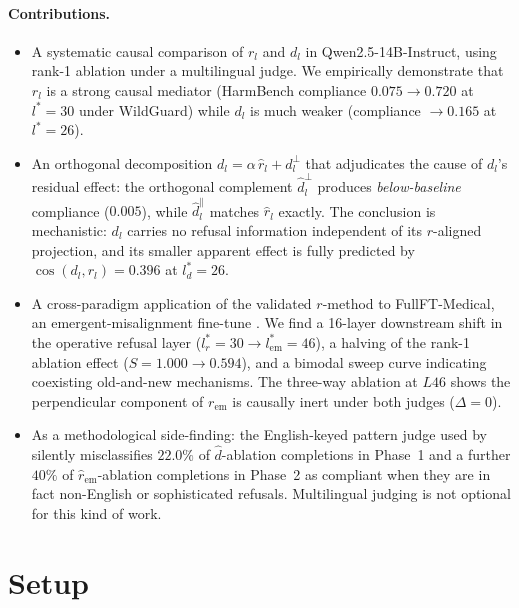 \paragraph{Contributions.}
\begin{itemize}\itemsep=0pt
\item A systematic causal comparison of $r_l$ and $d_l$ in
      Qwen2.5-14B-Instruct, using rank-1 ablation under a
      multilingual judge. We empirically demonstrate that $r_l$ is a
      strong causal mediator (HarmBench compliance
      $0.075 \to 0.720$ at $l^*=30$ under WildGuard) while $d_l$ is
      much weaker (compliance $\to 0.165$ at $l^*=26$).
\item An orthogonal decomposition $d_l = \alpha\,\hat{r}_l +
      d_l^\perp$ that adjudicates the cause of $d_l$'s residual
      effect: the orthogonal complement $\hat{d}_l^\perp$ produces
      \emph{below-baseline} compliance ($0.005$), while
      $\hat{d}_l^\parallel$ matches $\hat{r}_l$ exactly. The
      conclusion is mechanistic: $d_l$ carries no refusal information
      independent of its $r$-aligned projection, and its smaller
      apparent effect is fully predicted by
      $\cos(d_l, r_l) = 0.396$ at $l^*_d = 26$.
\item A cross-paradigm application of the validated $r$-method to
      FullFT-Medical, an emergent-misalignment fine-tune
      \citep{betley2025emergent}. We find a 16-layer downstream shift
      in the operative refusal layer
      ($l^*_r = 30 \to l^*_{\text{em}} = 46$), a halving of the
      rank-1 ablation effect ($S = 1.000 \to 0.594$), and a bimodal
      sweep curve indicating coexisting old-and-new mechanisms. The
      three-way ablation at $L46$ shows the perpendicular component
      of $r_{\text{em}}$ is causally inert under both judges
      ($\Delta = 0$).
\item As a methodological side-finding: the English-keyed pattern
      judge used by \citet{arditi2024refusal} silently misclassifies
      $22.0\%$ of $\hat{d}$-ablation completions in Phase~1 and a
      further $40\%$ of $\hat{r}_{\text{em}}$-ablation completions in
      Phase~2 as compliant when they are in fact non-English or
      sophisticated refusals. Multilingual judging is not optional
      for this kind of work.
\end{itemize}

\section{Setup}
\label{sec:setup}

